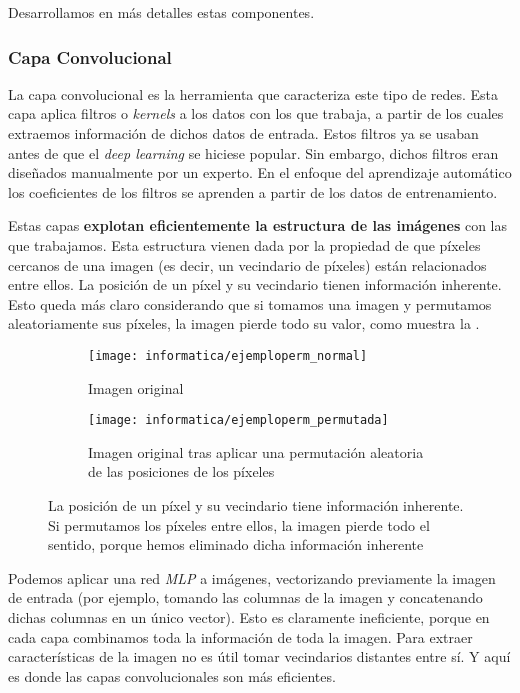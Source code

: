 Desarrollamos en más detalles estas componentes.

\subsubsection{Capa Convolucional}

La capa convolucional es la herramienta que caracteriza este tipo de redes. Esta capa aplica filtros o \textit{kernels} a los datos con los que trabaja, a partir de los cuales extraemos información de dichos datos de entrada. Estos filtros ya se usaban antes de que el \textit{deep learning} se hiciese popular. Sin embargo, dichos filtros eran diseñados manualmente por un experto. En el enfoque del aprendizaje automático los coeficientes de los filtros se aprenden a partir de los datos de entrenamiento.

Estas capas \textbf{explotan eficientemente la estructura de las imágenes} con las que trabajamos. Esta estructura vienen dada por la propiedad de que píxeles cercanos de una imagen (es decir, un vecindario de píxeles) están relacionados entre ellos. La posición de un píxel y su vecindario tienen información inherente. Esto queda más claro considerando que si tomamos una imagen y permutamos aleatoriamente sus píxeles, la imagen pierde todo su valor, como muestra la .

\begin{figure}[H]
    \centering
    \ajustarsubcaptions
    \begin{subfigure}[t]{0.45\textwidth}
        \centering
        \texttt{[image: informatica/ejemploperm\_normal]}
        \caption{Imagen original}
    \end{subfigure}
    \begin{subfigure}[t]{0.45\textwidth}
        \centering
        \texttt{[image: informatica/ejemploperm\_permutada]}
        \caption{Imagen original tras aplicar una permutación aleatoria de las posiciones de los píxeles}
    \end{subfigure}
    \caption{La posición de un píxel y su vecindario tiene información inherente. Si permutamos los píxeles entre ellos, la imagen pierde todo el sentido, porque hemos eliminado dicha información inherente}
    \label{img:desordenar_pixeles}
\end{figure}

Podemos aplicar una red \textit{MLP} a imágenes, vectorizando previamente la imagen de entrada (por ejemplo, tomando las columnas de la imagen y concatenando dichas columnas en un único vector). Esto es claramente ineficiente, porque en cada capa combinamos toda la información de toda la imagen. Para extraer características de la imagen no es útil tomar vecindarios distantes entre sí. Y aquí es donde las capas convolucionales son más eficientes.

